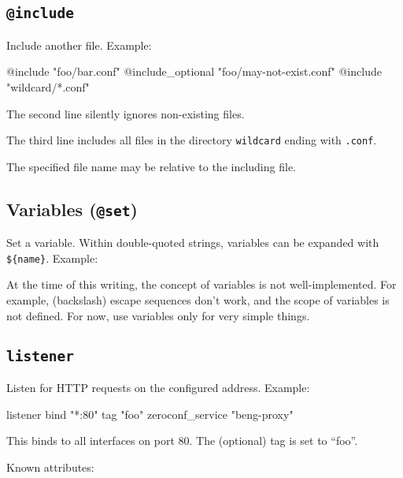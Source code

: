 \documentclass[a4paper,12pt]{article}
\begin{document}
\subsection{\texttt{@include}}

Include another file.  Example:

\begin{verbatim*}
@include "foo/bar.conf"
@include_optional "foo/may-not-exist.conf"
@include "wildcard/*.conf"
\end{verbatim*}

The second line silently ignores non-existing files.

The third line includes all files in the directory \texttt{wildcard}
ending with \texttt{.conf}.

The specified file name may be relative to the including file.

\subsection{Variables (\texttt{@set})}

Set a variable.  Within double-quoted strings, variables can be
expanded with \verb|${name}|.  Example:


At the time of this writing, the concept of variables is not
well-implemented.  For example, (backslash) escape sequences don't
work, and the scope of variables is not defined.  For now, use
variables only for very simple things.

\subsection{\texttt{listener}}

Listen for HTTP requests on the configured address.  Example:

\begin{verbatim*}
listener {
   bind "*:80"
   tag "foo"
   zeroconf_service "beng-proxy"
}
\end{verbatim*}

This binds to all interfaces on port 80.  The (optional) tag is set to
``foo''.

Known attributes:
\end{document}
